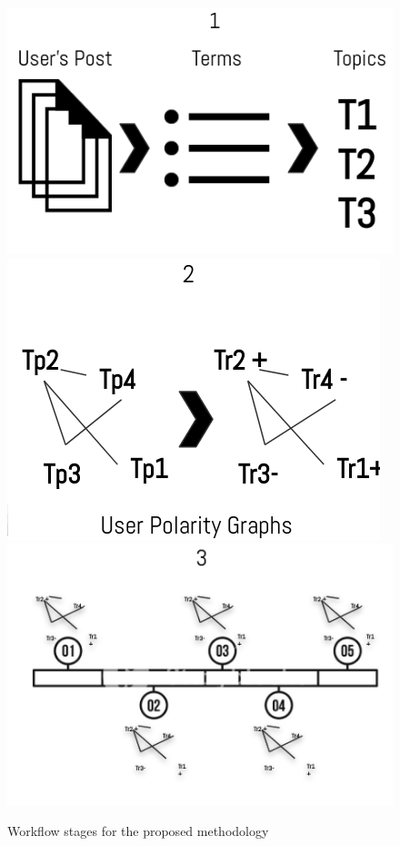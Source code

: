 \documentclass[sigconf]{acmart}
\begin{document}
\begin{figure}[!h]
  \centering
  \includegraphics[scale=.3]{Figures/method_1.png}
  \hspace{.5cm}
  \includegraphics[scale=.3]{Figures/method_2.png}\\
  \vspace{.2cm}
  \includegraphics[scale=.45]{Figures/method_3.png}
  \caption{Workflow stages for the proposed methodology}
  \label{fig:my_label}
\end{figure}
\end{document}
